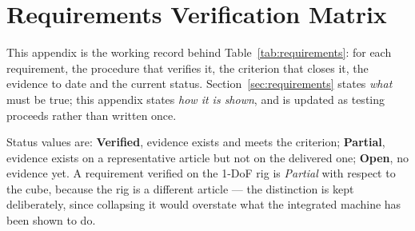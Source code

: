 \section{Requirements Verification Matrix}
\label{app:verification}

This appendix is the working record behind Table~\ref{tab:requirements}: for
each requirement, the procedure that verifies it, the criterion that closes it,
the evidence to date and the current status. Section~\ref{sec:requirements}
states \emph{what} must be true; this appendix states \emph{how it is shown},
and is updated as testing proceeds rather than written once.

Status values are: \textbf{Verified}, evidence exists and meets the criterion;
\textbf{Partial}, evidence exists on a representative article but not on the
delivered one; \textbf{Open}, no evidence yet. A requirement verified on the
1-DoF rig is \emph{Partial} with respect to the cube, because the rig is a
different article --- the distinction is kept deliberately, since collapsing it
would overstate what the integrated machine has been shown to do.

